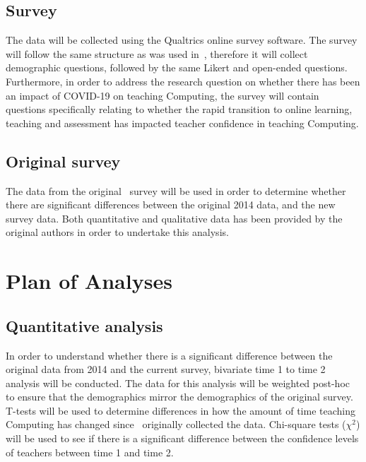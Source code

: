 \documentclass[]{interact}
\theoremstyle{plain}%
\theoremstyle{definition}
\theoremstyle{remark}
\begin{document}
{\subsection{Survey}

The data will be collected using the Qualtrics online survey
software. The survey will follow the same structure as was used
in~\citet{sentance+csizmadia:2017}, therefore it will collect
demographic questions, followed by the same Likert and open-ended
questions. Furthermore, in order to address the research question on
whether there has been an impact of COVID-19 on teaching Computing,
the survey will contain questions specifically relating to whether the
rapid transition to online learning, teaching and assessment has
impacted teacher confidence in teaching Computing.

\subsection{Original survey}

The data from the original~\citet{sentance+csizmadia:2017} survey will
be used in order to determine whether there are significant
differences between the original 2014 data, and the new survey data. Both
quantitative and qualitative data has been provided by the original
authors in order to undertake this analysis.

\section{Plan of Analyses}

\subsection{Quantitative analysis}

In order to understand whether there is a significant difference
between the original data from 2014 and the current survey, bivariate
time 1 to time 2 analysis will be conducted. The data for this
analysis will be weighted post-hoc to ensure that the demographics
mirror the demographics of the original survey. T-tests will be used
to determine differences in how the amount of time teaching Computing
has changed since~\citeauthor*{sentance+csizmadia:2017} originally collected
the data. Chi-square tests ($\chi^2$) will be used to see if there is
a significant difference between the confidence levels of teachers
between time 1 and time 2.

}
\end{document}
